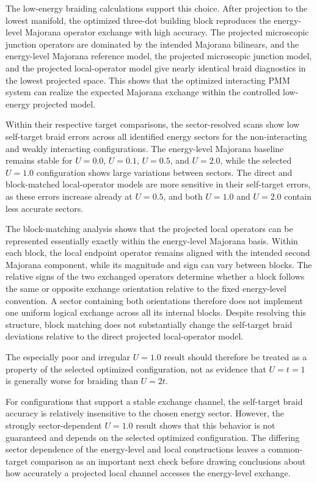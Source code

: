 The low-energy braiding calculations support this choice. After projection to the lowest manifold, the optimized three-dot building block reproduces the energy-level Majorana operator exchange with high accuracy. The projected microscopic junction operators are dominated by the intended Majorana bilinears, and the energy-level Majorana reference model, the projected microscopic junction model, and the projected local-operator model give nearly identical braid diagnostics in the lowest projected space. This shows that the optimized interacting PMM system can realize the expected Majorana exchange within the controlled low-energy projected model.

Within their respective target comparisons, the sector-resolved scans show low self-target braid errors across all identified energy sectors for the non-interacting and weakly interacting configurations. The energy-level Majorana baseline remains stable for $U=0.0$, $U=0.1$, $U=0.5$, and $U=2.0$, while the selected $U=1.0$ configuration shows large variations between sectors. The direct and block-matched local-operator models are more sensitive in their self-target errors, as these errors increase already at $U=0.5$, and both $U=1.0$ and $U=2.0$ contain less accurate sectors.

The block-matching analysis shows that the projected local operators can be represented essentially exactly within the energy-level Majorana basis. Within each block, the local endpoint operator remains aligned with the intended second Majorana component, while its magnitude and sign can vary between blocks. The relative signs of the two exchanged operators determine whether a block follows the same or opposite exchange orientation relative to the fixed energy-level convention. A sector containing both orientations therefore does not implement one uniform logical exchange across all its internal blocks. Despite resolving this structure, block matching does not substantially change the self-target braid deviations relative to the direct projected local-operator model.

The especially poor and irregular $U=1.0$ result should therefore be treated as a property of the selected optimized configuration, not as evidence that $U=t=1$ is generally worse for braiding than $U=2t$.

For configurations that support a stable exchange channel, the self-target braid accuracy is relatively insensitive to the chosen energy sector. However, the strongly sector-dependent $U=1.0$ result shows that this behavior is not guaranteed and depends on the selected optimized configuration. The differing sector dependence of the energy-level and local constructions leaves a common-target comparison as an important next check before drawing conclusions about how accurately a projected local channel accesses the energy-level exchange.
